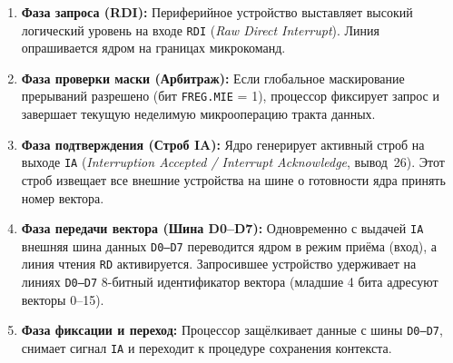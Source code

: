\documentclass[11pt,a4paper]{article}
\newcommand{\reg}[1]{\texttt{#1}}
\begin{document}
\begin{enumerate}
  \item \textbf{Фаза запроса (RDI):} Периферийное устройство выставляет высокий логический уровень на входе \texttt{RDI} (\textit{Raw Direct Interrupt}). Линия опрашивается ядром на границах микрокоманд.
  \item \textbf{Фаза проверки маски (Арбитраж):} Если глобальное маскирование прерываний разрешено (бит \reg{FREG.MIE} = 1), процессор фиксирует запрос и завершает текущую неделимую микрооперацию тракта данных.
  \item \textbf{Фаза подтверждения (Строб IA):} Ядро генерирует активный строб на выходе \texttt{IA} (\textit{Interruption Accepted / Interrupt Acknowledge}, вывод~26). Этот строб извещает все внешние устройства на шине о готовности ядра принять номер вектора.
  \item \textbf{Фаза передачи вектора (Шина D0--D7):} Одновременно с выдачей \texttt{IA} внешняя шина данных \texttt{D0--D7} переводится ядром в режим приёма (вход), а линия чтения \texttt{RD} активируется. Запросившее устройство удерживает на линиях \texttt{D0--D7} 8-битный идентификатор вектора (младшие 4 бита адресуют векторы 0--15).
  \item \textbf{Фаза фиксации и переход:} Процессор защёлкивает данные с шины \texttt{D0--D7}, снимает сигнал \texttt{IA} и переходит к процедуре сохранения контекста.
\end{enumerate}
\end{document}
